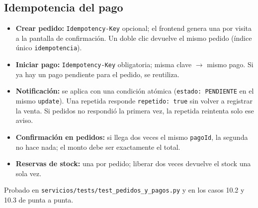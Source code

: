 \subsection{Idempotencia del pago}

\begin{itemize}[nosep,leftmargin=*]
\item \textbf{Crear pedido:} \texttt{Idempotency-\allowbreak{}Key} opcional; el frontend genera una por visita a la pantalla de confirmación. Un doble clic devuelve el mismo pedido (índice único \texttt{idempotencia}).
\item \textbf{Iniciar pago:} \texttt{Idempotency-\allowbreak{}Key} obligatoria; misma clave $\rightarrow$ mismo pago. Si ya hay un pago pendiente para el pedido, se reutiliza.
\item \textbf{Notificación:} se aplica con una condición atómica (\texttt{estado:\allowbreak{} PENDIENTE} en el mismo \texttt{update}). Una repetida responde \texttt{repetido:\allowbreak{} true} sin volver a registrar la venta. Si pedidos no respondió la primera vez, la repetida reintenta solo ese aviso.
\item \textbf{Confirmación en pedidos:} si llega dos veces el mismo \texttt{pagoId}, la segunda no hace nada; el monto debe ser exactamente el total.
\item \textbf{Reservas de stock:} una por pedido; liberar dos veces devuelve el stock una sola vez.
\end{itemize}

Probado en \texttt{servicios/\allowbreak{}tests/\allowbreak{}test\_\allowbreak{}pedidos\_\allowbreak{}y\_\allowbreak{}pagos.\allowbreak{}py} y en los casos 10.2 y 10.3 de punta a punta.

